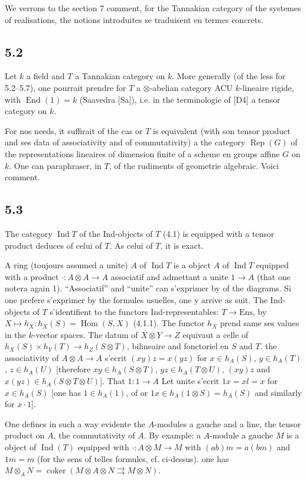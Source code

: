 \documentclass[12pt,a4paper]{article}
\theoremstyle{plain}
\theoremstyle{definition}
\theoremstyle{remark}
\DeclareMathOperator{\Hom}{Hom}
\DeclareMathOperator{\End}{End}
\DeclareMathOperator{\Ind}{Ind}
\DeclareMathOperator{\Rep}{Rep}
\DeclareMathOperator{\coker}{coker}
\begin{document}
We verrons to the section 7 comment, for the Tannakian category of the systemes of realisations, the notions introduites se traduisent en termes concrets.

\subsection*{5.2}
Let $k$ a field and $T$ a Tannakian category on $k$. More generally (of the less for 5.2--5.7), one pourrait prendre for $T$ a $\otimes$-abelian category ACU $k$-lineaire rigide, with $\End(1) = k$ (Saavedra [Sa]), i.e. in the terminologie of [D4] a tensor category on $k$.

For nos needs, it suffirait of the cas or $T$ is equivalent (with son tensor product and ses data of associativity and of commutativity) a the category $\Rep(G)$ of the representations lineaires of dimension finite of a scheme en groups affine $G$ on $k$. One can paraphraser, in $T$, of the rudiments of geometrie algebraic. Voici comment.

\subsection*{5.3}
The category $\Ind T$ of the Ind-objects of $T$ (4.1) is equipped with a tensor product deduces of celui of $T$. As celui of $T$, it is exact.

A ring (toujours assumed a unite) $A$ of $\Ind T$ is a object $A$ of $\Ind T$ equipped with a product $\cdot: A 
\otimes A 
\to A$ associatif and admettant a unite $1 
\to A$ (that one notera again 1). ``Associatif'' and ``unite'' can s'exprimer by of the diagrams. Si one prefere s'exprimer by the formules usuelles, one y arrive as suit. The Ind-objects of $T$ s'identifient to the functors Ind-representables: $T 
\to 
\text{Ens}$, by $X 
\mapsto h_X: h_X(S) = 
\Hom(S,X)$ (4.1.1). The functor $h_X$ prend same ses values in the $k$-vector spaces. The datum of $X 
\otimes Y 
\to Z$ equivaut a celle of $h_X(S) 
\times h_Y(T) 
\to h_Z(S 
\otimes T)$, bilineaire and fonctoriel en $S$ and $T$. the associativity of $A 
\otimes A 
\to A$ s'ecrit $(xy)z = x(yz)$ for $x 
\in h_A(S)$, $y 
\in h_A(T)$, $z 
\in h_A(U)$ [therefore $xy 
\in h_A(S 
\otimes T)$, $yz 
\in h_A(T 
\otimes U)$, $(xy)z$ and $x(yz) 
\in h_A(S 
\otimes T 
\otimes U)$]. That $1: 1 
\to A$ Let unite s'ecrit $1x = xl = x$ for $x 
\in h_A(S)$ [one has $1 
\in h_A(1)$, of or $1x 
\in h_A(1 
\otimes S) = h_A(S)$ and similarly for $x 
\cdot 1$].

One defines in such a way evidente the $A$-modules a gauche and a line, the tensor product on $A$, the commutativity of $A$. By example: a $A$-module a gauche $M$ is a object of $\Ind(T)$ equipped with $\cdot: A 
\otimes M 
\to M$ with $(ab)m = a(bm)$ and $1m = m$ (for the sens of telles formules, cf. ci-dessus). one has $M 
\otimes_A N = 
\coker(M 
\otimes A 
\otimes N 
\rightrightarrows M 
\otimes N)$.
\end{document}
